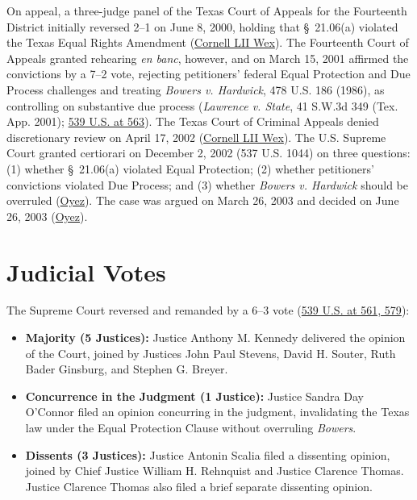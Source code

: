 \documentclass[12pt]{article}
\begin{document}
On appeal, a three-judge panel of the Texas Court of Appeals for the Fourteenth District initially reversed 2--1 on June 8, 2000, holding that \S~21.06(a) violated the Texas Equal Rights Amendment (\href{https://www.law.cornell.edu/wex/lawrence_v._texas}{Cornell LII Wex}). The Fourteenth Court of Appeals granted rehearing \textit{en banc}, however, and on March 15, 2001 affirmed the convictions by a 7--2 vote, rejecting petitioners' federal Equal Protection and Due Process challenges and treating \textit{Bowers v. Hardwick}, 478 U.S. 186 (1986), as controlling on substantive due process (\textit{Lawrence v. State}, 41 S.W.3d 349 (Tex. App. 2001); \href{https://www.law.cornell.edu/supremecourt/text/02-102}{539 U.S. at 563}). The Texas Court of Criminal Appeals denied discretionary review on April 17, 2002 (\href{https://www.law.cornell.edu/wex/lawrence_v._texas}{Cornell LII Wex}). The U.S. Supreme Court granted certiorari on December 2, 2002 (537 U.S. 1044) on three questions: (1) whether \S~21.06(a) violated Equal Protection; (2) whether petitioners' convictions violated Due Process; and (3) whether \textit{Bowers v. Hardwick} should be overruled (\href{https://www.oyez.org/cases/2002/02-102}{Oyez}). The case was argued on March 26, 2003 and decided on June 26, 2003 (\href{https://www.oyez.org/cases/2002/02-102}{Oyez}).

\section{Judicial Votes}
The Supreme Court reversed and remanded by a 6--3 vote (\href{https://www.law.cornell.edu/supremecourt/text/02-102}{539 U.S. at 561, 579}):
\begin{itemize}
\item \textbf{Majority (5 Justices):} Justice Anthony M. Kennedy delivered the opinion of the Court, joined by Justices John Paul Stevens, David H. Souter, Ruth Bader Ginsburg, and Stephen G. Breyer.
\item \textbf{Concurrence in the Judgment (1 Justice):} Justice Sandra Day O'Connor filed an opinion concurring in the judgment, invalidating the Texas law under the Equal Protection Clause without overruling \textit{Bowers}.
\item \textbf{Dissents (3 Justices):} Justice Antonin Scalia filed a dissenting opinion, joined by Chief Justice William H. Rehnquist and Justice Clarence Thomas. Justice Clarence Thomas also filed a brief separate dissenting opinion.
\end{itemize}
\end{document}
